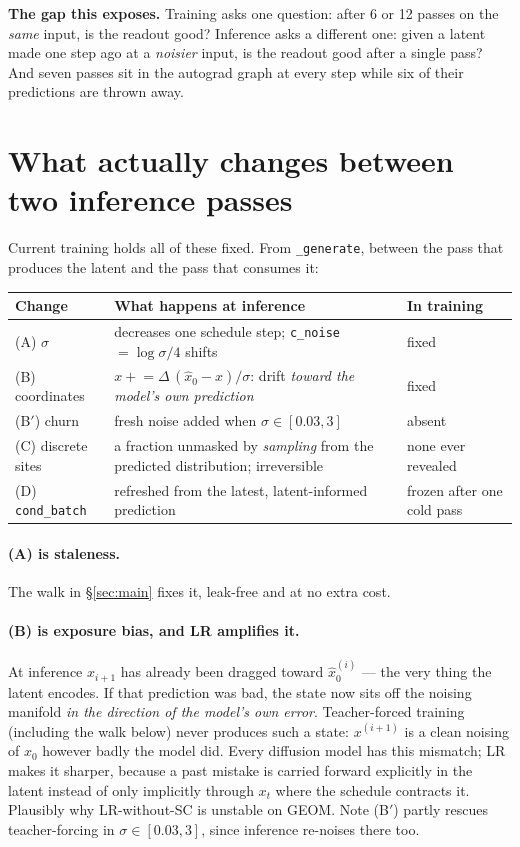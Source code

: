 \documentclass[11pt,a4paper]{article}
\newcommand{\xh}{\hat{x}_0}
\newcommand{\code}[1]{\texttt{#1}}
\begin{document}
\textbf{The gap this exposes.} Training asks one question: after 6 or 12 passes on the
\emph{same} input, is the readout good? Inference asks a different one: given a latent
made one step ago at a \emph{noisier} input, is the readout good after a single pass?
And seven passes sit in the autograd graph at every step while six of their
predictions are thrown away.

\section{What actually changes between two inference passes}\label{sec:gap}

Current training holds all of these fixed. From \code{\_generate}, between the pass
that produces the latent and the pass that consumes it:

\begin{center}
\begin{tabularx}{\textwidth}{@{}l Y l@{}}
\toprule
Change & What happens at inference & In training \\
\midrule
(A) $\sigma$ & decreases one schedule step; \code{c\_noise}$=\log\sigma/4$ shifts & fixed \\
(B) coordinates & $x \mathrel{+}= \Delta\,(\xh - x)/\sigma$: drift \emph{toward the model's own prediction} & fixed \\
(B$'$) churn & fresh noise added when $\sigma\in[0.03,3]$ & absent \\
(C) discrete sites & a fraction unmasked by \emph{sampling} from the predicted distribution; irreversible & none ever revealed \\
(D) \code{cond\_batch} & refreshed from the latest, latent-informed prediction & frozen after one cold pass \\
\bottomrule
\end{tabularx}
\end{center}

\paragraph{(A) is staleness.} The walk in \S\ref{sec:main} fixes it, leak-free and at
no extra cost.

\paragraph{(B) is exposure bias, and LR amplifies it.} At inference $x_{i+1}$ has
already been dragged toward $\xh^{(i)}$ --- the very thing the latent encodes. If that
prediction was bad, the state now sits off the noising manifold \emph{in the direction
of the model's own error}. Teacher-forced training (including the walk below) never
produces such a state: $x^{(i+1)}$ is a clean noising of $x_0$ however badly the model
did. Every diffusion model has this mismatch; LR makes it sharper, because a past
mistake is carried forward explicitly in the latent instead of only implicitly through
$x_t$ where the schedule contracts it. Plausibly why LR-without-SC is unstable on GEOM.
Note (B$'$) partly rescues teacher-forcing in $\sigma\in[0.03,3]$, since inference
re-noises there too.
\end{document}
